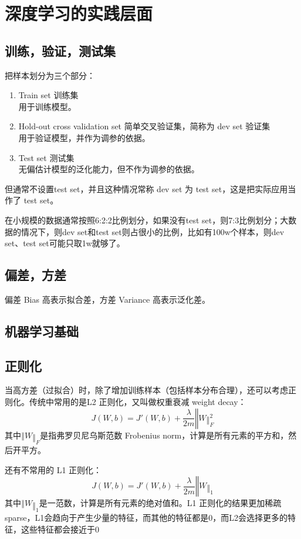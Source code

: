 \documentclass[../../main.tex]{subfiles}
\begin{document}
\chapter{深度学习的实践层面}

\section{训练，验证，测试集}
把样本划分为三个部分：
\begin{enumerate}
    \item Train set 训练集\\用于训练模型。
    \item Hold-out cross validation set 简单交叉验证集，简称为 dev set 验证集\\用于验证模型，并作为调参的依据。
    \item Test set 测试集\\无偏估计模型的泛化能力，但不作为调参的依据。
\end{enumerate}
但通常不设置test set，并且这种情况常称 dev set 为 test set，这是把实际应用当作了 test set。

在小规模的数据通常按照6:2:2比例划分，如果没有test set，则7:3比例划分；大数据的情况下，则dev set和test set则占很小的比例，比如有100w个样本，则dev set、test set可能只取1w就够了。

\section{偏差，方差}
偏差 Bias 高表示拟合差，方差 Variance 高表示泛化差。

\section{机器学习基础}

\section{正则化}
当高方差（过拟合）时，除了增加训练样本（包括样本分布合理），还可以考虑正则化。传统中常用的是L2 正则化，又叫做权重衰减 weight decay：
\[
    J(W, b) = J'(W, b) + \frac{λ}{2m}‖W‖_F^2
\]
其中\(‖W‖_F\)是指弗罗贝尼乌斯范数 Frobenius norm，计算是所有元素的平方和，然后开平方。

还有不常用的 L1 正则化：
\[
    J(W, b) = J'(W, b) + \frac{λ}{2m}‖W‖_1
\]
其中\(‖W‖_1\)是一范数，计算是所有元素的绝对值和。L1 正则化的结果更加稀疏 sparse，L1会趋向于产生少量的特征，而其他的特征都是0，而L2会选择更多的特征，这些特征都会接近于0
\end{document}
